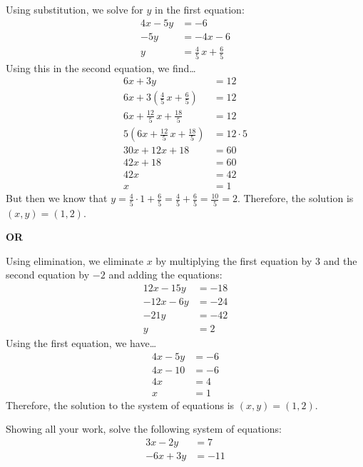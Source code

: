 \documentclass[11pt,letterpaper]{article}
\begin{document}
\sol Using substitution, we solve for $y$ in the first equation:
	\[
	\begin{aligned}
	4x - 5y&= -6 \\
	-5y&= -4x - 6 \\
	y&= \frac{4}{5}\,x + \frac{6}{5}
	\end{aligned}
	\] 
Using this in the second equation, we find\dots
	\[
	\begin{aligned}
	6x + 3y&= 12 \\
	6x + 3 \left( \frac{4}{5}\,x + \frac{6}{5} \right)&= 12 \\
	6x + \frac{12}{5}\,x + \frac{18}{5}&= 12 \\
	5 \left( 6x + \frac{12}{5}\,x + \frac{18}{5} \right)&= 12 \cdot 5 \\
	30x + 12 x + 18&= 60 \\
	42x + 18&= 60 \\
	42x&= 42 \\
	x&= 1
	\end{aligned}
	\] 
But then we know that $y= \frac{4}{5} \cdot 1 + \frac{6}{5}= \frac{4}{5} + \frac{6}{5}= \frac{10}{5}= 2$. Therefore, the solution is $(x, y)= (1, 2)$. 
	
\begin{center} {\bfseries OR} \end{center}

Using elimination, we eliminate $x$ by multiplying the first equation by 3 and the second equation by $-2$ and adding the equations:
	\[
	\begin{aligned}
	12x - 15y&= -18 \\
	-12x - 6y&= -24 \\ \hline
	-21y&= -42 \\
	y&= 2
	\end{aligned}
	\] 
Using the first equation, we have\dots
	\[
	\begin{aligned}
	4x - 5y&= -6 \\
	4x - 10&= -6 \\
	4x&= 4 \\
	x&= 1
	\end{aligned}
	\] 
Therefore, the solution to the system of equations is $(x, y)= (1, 2)$. 



\newpage



 Showing all your work, solve the following system of equations:
	\[
	\begin{aligned}
	3x - 2y&= 7 \\
	-6x + 3y&= -11
	\end{aligned}
	\] \pspace
\end{document}
